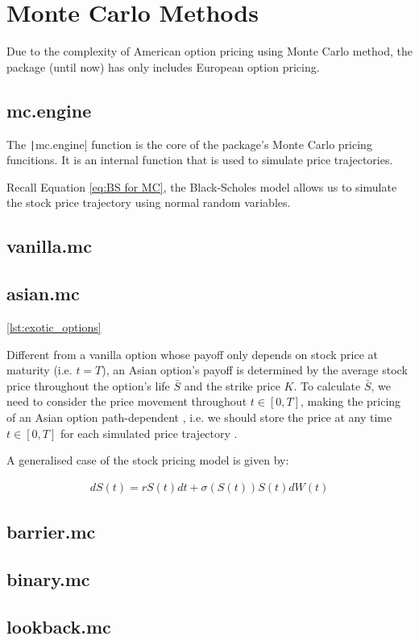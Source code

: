 \newpage

\section{Monte Carlo Methods}

Due to the complexity of American option pricing using Monte Carlo method, the package (until now) has only includes European option pricing.

\subsection{mc.engine}

The \texttt|mc.engine| function is the core of the package's Monte Carlo pricing funcitions. It is an internal function that is used to simulate price trajectories.

Recall Equation \ref{eq:BS for MC}, the Black-Scholes model allows us to simulate the stock price trajectory using normal random variables.






\subsection{vanilla.mc}



\subsection{asian.mc}

\ref{lst:exotic_options}

Different from a vanilla option whose payoff only depends on stock price at maturity (i.e. $t = T$), an Asian option's payoff is determined by the average stock price throughout the option's life $\bar{S}$ and the strike price $K$. To calculate $\bar{S}$, we need to consider the price movement throughout $t \in [0, T]$, making the pricing of an Asian option path-dependent , i.e. we should store the price at any time $t \in [0,T]$ for each simulated price trajectory \cite{Higham2004}.

A generalised case of the stock pricing model is given by:

\begin{align}
    dS(t) = rS(t)dt + \sigma(S(t))S(t)dW(t)
\end{align}

\subsection{barrier.mc}

\subsection{binary.mc}

\subsection{lookback.mc}



